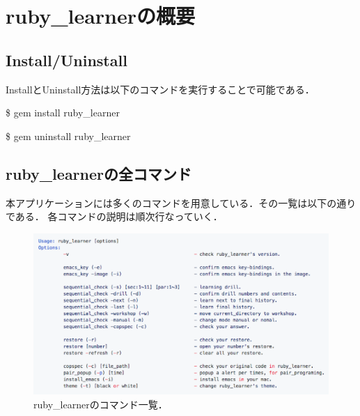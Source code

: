 
\chapter{ruby\_learnerの概要}

\section{Install/Uninstall}\label{install/uninstall}
InstallとUninstall方法は以下のコマンドを実行することで可能である．
\begin{description}
\def\labelenumi{\arabic{enumi}.}
\tightlist
\item[Install] \$ gem install ruby\_learner
\item[Uninstall] \$ gem uninstall ruby\_learner
\end{description}

\section{ruby\_learnerの全コマンド}\label{commands}
本アプリケーションには多くのコマンドを用意している．その一覧は以下の通りである．
各コマンドの説明は順次行なっていく．
\begin{figure}[H]
\centering
\begin{center}
\includegraphics[width=170mm]{../../picture/commands.png}
\end{center}
\caption{ruby\_learnerのコマンド一覧．\label{commands}}
\end{figure}

